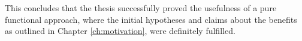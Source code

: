 \medskip

This concludes that the thesis successfully proved the usefulness of a pure functional approach, where the initial hypotheses and claims about the benefits as outlined in Chapter \ref{ch:motivation}, were definitely fulfilled.





%



